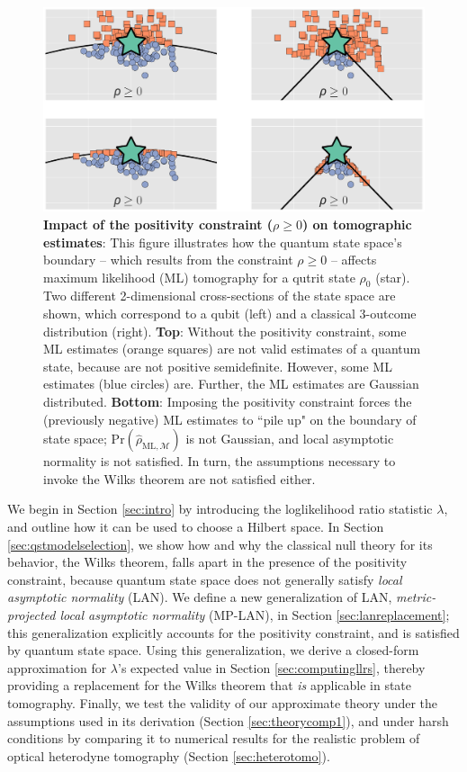 \documentclass[aps,pra, twocolumn]{revtex4-1}
\newcommand{\M}{\mathcal{M}}
\newcommand{\rhohat}{\hat{\rho}}
\newcommand{\rhoML}[1]{\rhohat_{\scriptscriptstyle{\mathrm{ML},#1}}}
\begin{document}
\begin{figure}
\includegraphics[width=\columnwidth]{Images/Figure_1.pdf}
 \caption{\textbf{Impact of the positivity constraint ($\rho\geq0$)  on tomographic estimates}:  This figure illustrates how the quantum state space's boundary -- which results from the constraint $\rho\geq0$ -- affects maximum likelihood (ML) tomography for a qutrit state $\rho_{0}$ (star).  Two different 2-dimensional cross-sections of the state space are shown, which correspond to a qubit (left) and a classical 3-outcome distribution (right). \textbf{Top}: Without the positivity constraint, some ML estimates (orange squares) are not valid estimates of a quantum state, because are not positive semidefinite. However, some ML estimates (blue circles) are. Further, the ML estimates are Gaussian distributed.
\textbf{Bottom}:  Imposing the positivity constraint forces the (previously negative) ML estimates to ``pile up" on the boundary of state space; $\mathrm{Pr}(\rhoML{\M})$ is not Gaussian, and local asymptotic normality is not satisfied. In turn, the assumptions necessary to invoke the Wilks theorem are not satisfied either.}
\label{fig:boundaries}
\end{figure}

We begin in Section \ref{sec:intro} by introducing the loglikelihood ratio statistic $\lambda$, and outline how it can be used to choose a Hilbert space.  In Section \ref{sec:qstmodelselection}, we show how and why the classical null theory for its behavior, the Wilks theorem, falls apart in the presence of the positivity constraint, because quantum state space does not generally satisfy \emph{local asymptotic normality} (LAN).  We define a new generalization of LAN, \emph{metric-projected local asymptotic normality} (MP-LAN), in Section \ref{sec:lanreplacement}; this generalization explicitly accounts for the positivity constraint, and is satisfied by quantum state space. Using this generalization, we derive a closed-form approximation for $\lambda$'s expected value in Section \ref{sec:computingllrs}, thereby providing a replacement for the Wilks theorem that \emph{is} applicable in state tomography.  Finally, we test the validity of our approximate theory under the assumptions used in its derivation (Section \ref{sec:theorycomp1}), and under harsh conditions by comparing it to numerical results for the realistic problem of optical heterodyne tomography (Section \ref{sec:heterotomo}).
\end{document}
